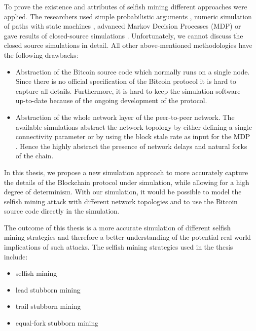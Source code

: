 To prove the existence and attributes of selfish mining different approaches were applied.
The researchers used simple probabilistic arguments \cite{eyal2014majority, bahack2013theoretical}, numeric simulation of paths with state machines \cite{gervais2015tampering, nayak2016stubborn}, advanced Markov Decision Processes (MDP) \cite{sapirshtein2016optimal, gervais2016security} or gave results of closed-source simulations \cite{eyal2014majority, sapirshtein2016optimal}.
Unfortunately, we cannot discuss the closed source simulations in detail.
All other above-mentioned methodologies have the following drawbacks:
\begin{itemize}
\item Abstraction of the Bitcoin source code which normally runs on a single node.
Since there is no official specification of the Bitcoin protocol it is hard to capture all details.
Furthermore, it is hard to keep the simulation software up-to-date because of the ongoing development of the protocol.
\item Abstraction of the whole network layer of the peer-to-peer network.
The available simulations abstract the network topology by either defining a single connectivity parameter \cite{eyal2014majority, bahack2013theoretical, nayak2016stubborn, sapirshtein2016optimal, gervais2015tampering} or by using the block stale rate as input for the MDP \cite{gervais2016security}.
Hence the highly abstract the presence of network delays and natural forks of the chain.
\end{itemize}

In this thesis, we propose a new simulation approach to more accurately capture the details of the Blockchain protocol under simulation, while allowing for a high degree of determinism.
With our simulation, it would be possible to model the selfish mining attack with different network topologies and to use the Bitcoin source code directly in the simulation.

The outcome of this thesis is a more accurate simulation of different selfish mining strategies and therefore a better understanding of the potential real world implications of such attacks.
The selfish mining strategies used in the thesis include:
\begin{itemize}
\item selfish mining \cite{eyal2014majority}
\item lead stubborn mining \cite{nayak2016stubborn}
\item trail stubborn mining \cite{nayak2016stubborn}
\item equal-fork stubborn mining \cite{nayak2016stubborn}
\end{itemize}

